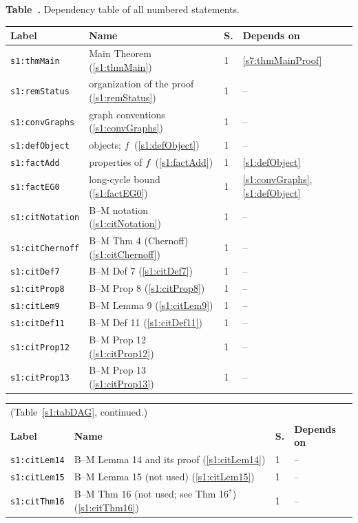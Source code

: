 \begin{center}
\label{s1:tabDAG}
\textbf{Table~\thetable.} Dependency table of all numbered statements.\\[4pt]
{\footnotesize
\setlength{\tabcolsep}{3pt}
\begin{tabular}{p{3.2cm}p{3.6cm}p{0.5cm}p{7.6cm}}
\textbf{Label} & \textbf{Name} & \textbf{S.} & \textbf{Depends on}\\
\hline
\texttt{s1:thmMain} & Main Theorem (\ref{s1:thmMain}) & 1 & \ref{s7:thmMainProof}\\
\texttt{s1:remStatus} & organization of the proof (\ref{s1:remStatus}) & 1 & --\\
\texttt{s1:convGraphs} & graph conventions (\ref{s1:convGraphs}) & 1 & --\\
\texttt{s1:defObject} & objects; $f$ (\ref{s1:defObject}) & 1 & --\\
\texttt{s1:factAdd} & properties of $f$ (\ref{s1:factAdd}) & 1 & \ref{s1:defObject}\\
\texttt{s1:factEG0} & long-cycle bound (\ref{s1:factEG0}) & 1 & \ref{s1:convGraphs}, \ref{s1:defObject}\\
\texttt{s1:citNotation} & B--M notation (\ref{s1:citNotation}) & 1 & --\\
\texttt{s1:citChernoff} & B--M Thm 4 (Chernoff) (\ref{s1:citChernoff}) & 1 & --\\
\texttt{s1:citDef7} & B--M Def 7 (\ref{s1:citDef7}) & 1 & --\\
\texttt{s1:citProp8} & B--M Prop 8 (\ref{s1:citProp8}) & 1 & --\\
\texttt{s1:citLem9} & B--M Lemma 9 (\ref{s1:citLem9}) & 1 & --\\
\texttt{s1:citDef11} & B--M Def 11 (\ref{s1:citDef11}) & 1 & --\\
\texttt{s1:citProp12} & B--M Prop 12 (\ref{s1:citProp12}) & 1 & --\\
\texttt{s1:citProp13} & B--M Prop 13 (\ref{s1:citProp13}) & 1 & --\\
\hline
\end{tabular}}
\end{center}

\begin{center}
{\footnotesize
\setlength{\tabcolsep}{3pt}
\begin{tabular}{p{3.2cm}p{3.6cm}p{0.5cm}p{7.6cm}}
\multicolumn{4}{l}{(Table~\ref{s1:tabDAG}, continued.)}\\
\textbf{Label} & \textbf{Name} & \textbf{S.} & \textbf{Depends on}\\
\hline
\texttt{s1:citLem14} & B--M Lemma 14 and its proof (\ref{s1:citLem14}) & 1 & --\\
\texttt{s1:citLem15} & B--M Lemma 15 (not used) (\ref{s1:citLem15}) & 1 & --\\
\texttt{s1:citThm16} & B--M Thm 16 (not used; see Thm 16$^*$) (\ref{s1:citThm16}) & 1 & --\\
\hline
\end{tabular}}
\end{center}

